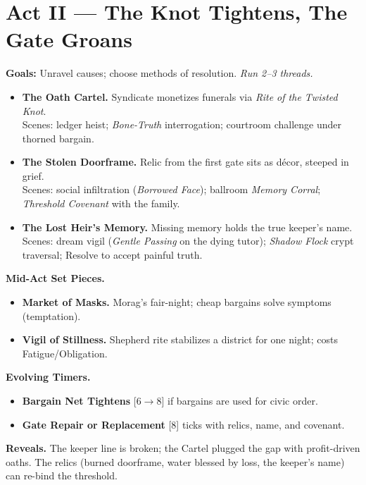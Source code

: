 \documentclass[11pt]{article}
\newcommand{\timer}[1]{\textsc{[#1]}}
\begin{document}
\section*{Act II --- The Knot Tightens, The Gate Groans}
\textbf{Goals:} Unravel causes; choose methods of resolution. \emph{Run 2--3 threads.}
\begin{itemize}
  \item \textbf{The Oath Cartel.} Syndicate monetizes funerals via \textit{Rite of the Twisted Knot}.\\
  Scenes: ledger heist; \textit{Bone-Truth} interrogation; courtroom challenge under thorned bargain.
  \item \textbf{The Stolen Doorframe.} Relic from the first gate sits as décor, steeped in grief.\\
  Scenes: social infiltration (\textit{Borrowed Face}); ballroom \textit{Memory Corral}; \textit{Threshold Covenant} with the family.
  \item \textbf{The Lost Heir's Memory.} Missing memory holds the true keeper's name.\\
  Scenes: dream vigil (\textit{Gentle Passing} on the dying tutor); \textit{Shadow Flock} crypt traversal; Resolve to accept painful truth.
\end{itemize}
\textbf{Mid-Act Set Pieces.}
\begin{itemize}
  \item \textbf{Market of Masks.} Morag's fair-night; cheap bargains solve symptoms (temptation).
  \item \textbf{Vigil of Stillness.} Shepherd rite stabilizes a district for one night; costs Fatigue/Obligation.
\end{itemize}
\textbf{Evolving Timers.}
\begin{itemize}
  \item \textbf{Bargain Net Tightens} \timer{6$\to$8} if bargains are used for civic order.
  \item \textbf{Gate Repair or Replacement} \timer{8} ticks with relics, name, and covenant.
\end{itemize}
\textbf{Reveals.} The keeper line is broken; the Cartel plugged the gap with profit-driven oaths. The relics (burned doorframe, water blessed by loss, the keeper's name) can re-bind the threshold.
\end{document}
